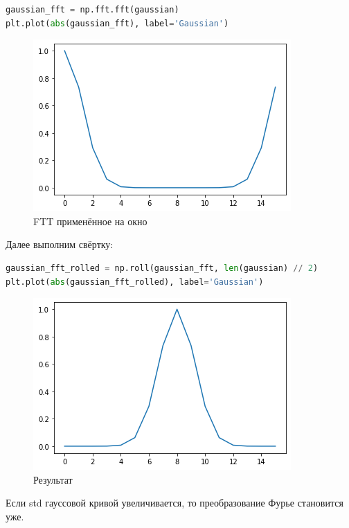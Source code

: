 \begin{lstlisting}[language=Python]
gaussian_fft = np.fft.fft(gaussian)
plt.plot(abs(gaussian_fft), label='Gaussian')
\end{lstlisting}
\begin{figure}[H]
	\begin{center}
		\includegraphics[scale=1]{fig/lab08/lab08_11_1.png}
		\caption{FTT применённое на окно}
	\end{center}
\end{figure}

Далее выполним свёртку:

\begin{lstlisting}[language=Python]
gaussian_fft_rolled = np.roll(gaussian_fft, len(gaussian) // 2)
plt.plot(abs(gaussian_fft_rolled), label='Gaussian')
\end{lstlisting}
\begin{figure}[H]
	\begin{center}
		\includegraphics[scale=1]{fig/lab08/lab08_13_1.png}
		\caption{Результат}
	\end{center}
\end{figure}

Если std гауссовой кривой увеличивается, то преобразование Фурье становится уже.


